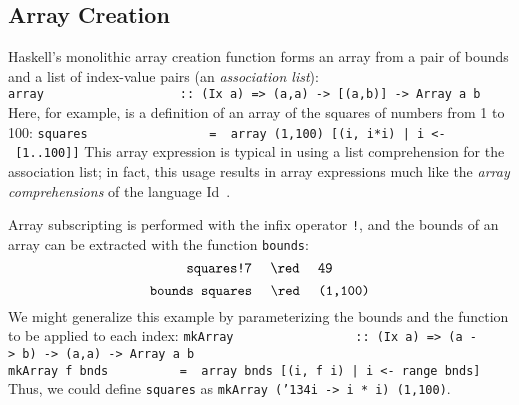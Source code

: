 \subsection{Array Creation}
Haskell's monolithic array creation function forms an array from a
pair of bounds and a list of index-value pairs (an {\em association
list}):
\bprog
\mbox{\tt array\ \ \ \ \ \ \ \ \ \ \ \ \ \ \ \ \ \ \ ::\ (Ix\ a)\ =>\ (a,a)\ ->\ [(a,b)]\ ->\ Array\ a\ b}
\eprog
Here, for example, is a definition of an array of the squares
of numbers from 1 to 100:
\bprog
\mbox{\tt squares\ \ \ \ \ \ \ \ \ \ \ \ \ \ \ \ \ =\ \ array\ (1,100)\ [(i,\ i*i)\ |\ i\ <-\ [1..100]]}
\eprog
This array expression is typical in using a list comprehension for
the association list; in fact, this usage results in array expressions
much like the {\em array comprehensions} of the language Id~\cite{id-manual}.

Array subscripting is performed with the infix operator \mbox{\tt !}, and the
bounds of an array can be extracted with the function \mbox{\tt bounds}:
\[ \mbox{\tt squares!7}\ \ \ \ \red\ \ \ \ \mbox{\tt 49} \]
\[ \mbox{\tt bounds\ squares}\ \ \ \ \red\ \ \ \ \mbox{\tt (1,100)} \]
We might  generalize this example by parameterizing the bounds and the
function to be applied to each index:
\bprog
\mbox{\tt mkArray\ \ \ \ \ \ \ \ \ \ \ \ \ \ \ \ \ ::\ (Ix\ a)\ =>\ (a\ ->\ b)\ ->\ (a,a)\ ->\ Array\ a\ b}\\
\mbox{\tt mkArray\ f\ bnds\ \ \ \ \ \ \ \ \ \ =\ \ array\ bnds\ [(i,\ f\ i)\ |\ i\ <-\ range\ bnds]}
\eprog
Thus, we could define \mbox{\tt squares} as \mbox{\tt mkArray\ ({\char'134}i\ ->\ i\ *\ i)\ (1,100)}.

